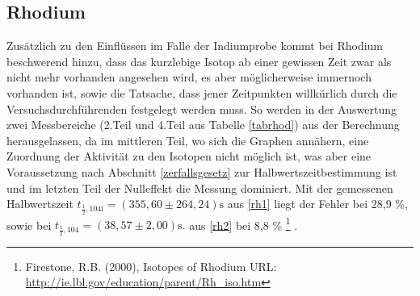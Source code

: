 \subsection{Rhodium}
Zusätzlich zu den Einflüssen im Falle der Indiumprobe kommt bei Rhodium beschwerend hinzu, dass das kurzlebige Isotop ab einer gewissen
Zeit zwar als nicht mehr vorhanden angesehen wird, es aber möglicherweise immernoch vorhanden ist, sowie die Tatsache, dass jener Zeitpunkten
willkürlich durch die Versuchsdurchführenden festgelegt werden muss. So werden in der Auswertung zwei Messbereiche 
(2.Teil und 4.Teil aus Tabelle \ref{tabrhod}) aus der Berechnung herausgelassen, da im mittleren Teil, wo sich die Graphen annähern, eine Zuordnung 
der Aktivität zu den Isotopen nicht möglich ist, was aber eine Voraussetzung nach Abschnitt \ref{zerfallsgesetz} zur Halbwertszeitbestimmung 
ist und im letzten Teil der Nulleffekt die Messung dominiert. Mit der gemessenen Halbwertszeit 
$t_{\frac12,\text{104i}} = (355,60 \pm 264,24) \text{s}$ aus \eqref{rh1}
liegt der Fehler bei 28,9 \%, sowie bei $t_{\frac12,\text{104}} = (38,57 \pm 2,00) \text{s}.$ aus \eqref{rh2} bei 8,8 \% \footnote[2]{Firestone, R.B. (2000), Isotopes of Rhodium URL: \href{http://ie.lbl.gov/education/parent/Rh\_iso.htm}{http://ie.lbl.gov/education/parent/Rh\_iso.htm}} . 





